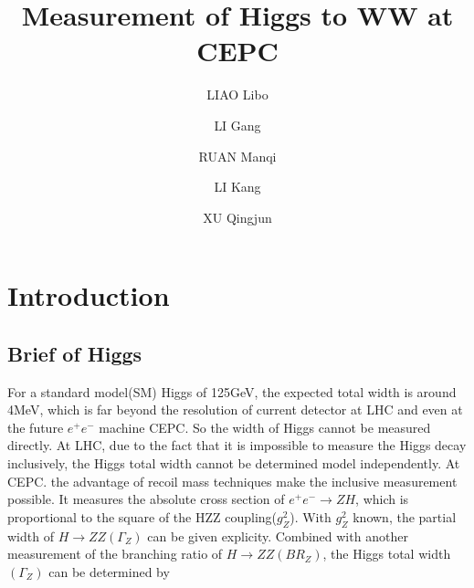 \documentclass[11pt,a4paper]{cepcnote}
\title{ Measurement of Higgs to WW at CEPC }
\author[a]{LIAO Libo}
\author[b]{LI Gang}
\author[b]{RUAN Manqi}
\author[a]{LI Kang}
\author[a]{XU Qingjun}
\affil[a]{Hangzhou Normal University}
\affil[b]{Institute of High Energy Physics}
\begin{document}
\tableofcontents
\clearpage

\section{Introduction}

\subsection{Brief of Higgs}
For a standard model(SM) Higgs of 125GeV, the expected total width is around 4MeV, which is far beyond the resolution of current detector at LHC and even at the future $e^+ e^-$ machine CEPC.
So the width of Higgs cannot be measured directly. At LHC, due to the fact that it is impossible to measure the Higgs decay inclusively, the Higgs total width cannot be determined model independently. 
At CEPC. the advantage of recoil mass techniques make the inclusive measurement possible. 
It measures the absolute cross section of $e^+ e^- \rightarrow ZH$, which is proportional to the square of the HZZ coupling($g^2_Z$).
With $g^2_Z$ known, the partial width of $H \rightarrow ZZ(\Gamma_Z)$ can be given explicity. 
Combined with another measurement of the branching ratio of $H \rightarrow ZZ(BR_Z)$, the Higgs total width$(\Gamma_Z)$ can be determined by
\end{document}
